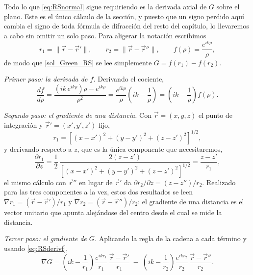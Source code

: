		Todo lo que \eqref{eq:RSnormal} sigue requiriendo es la derivada axial de $G$ sobre el plano. Este es el único cálculo de la sección, y puesto que un signo perdido aquí cambia el signo de toda fórmula de difracción del resto del capítulo, lo llevaremos a cabo sin omitir un solo paso. Para aligerar la notación escribimos
		\begin{equation}\label{eq:RSDistances}
			r_{1} = \|\vec{r}-\vec{r}'\|, \qquad r_{2} = \|\vec{r}-\vec{r}''\|, \qquad f(\rho) = \dfrac{e^{ik\rho}}{\rho},
		\end{equation}
		de modo que \eqref{sol_Green_RS} se lee simplemente $G = f(r_{1}) - f(r_{2})$.

		\textit{Primer paso: la derivada de $f$.} Derivando el cociente,
		\begin{equation}\label{eq:RSderivf}
			\dfrac{df}{d\rho} = \dfrac{\left(ik\,e^{ik\rho}\right)\rho - e^{ik\rho}}{\rho^{2}} = \dfrac{e^{ik\rho}}{\rho}\left(ik - \dfrac{1}{\rho}\right) = \left(ik-\dfrac{1}{\rho}\right)f(\rho).
		\end{equation}

		\textit{Segundo paso: el gradiente de una distancia.} Con $\vec{r} = (x,y,z)$ el punto de integración y $\vec{r}' = (x',y',z')$ fijo,
		\begin{equation}\label{eq:RSr1}
			r_{1} = \left[(x-x')^{2}+(y-y')^{2}+(z-z')^{2}\right]^{1/2},
		\end{equation}
		y derivando respecto a $z$, que es la única componente que necesitaremos,
		\begin{equation}\label{eq:RSdr1dz}
			\dfrac{\partial r_{1}}{\partial z} = \dfrac{1}{2}\,\dfrac{2\left(z-z'\right)}{\left[(x-x')^{2}+(y-y')^{2}+(z-z')^{2}\right]^{1/2}} = \dfrac{z-z'}{r_{1}} ,
		\end{equation}
		el mismo cálculo con $\vec{r}''$ en lugar de $\vec{r}'$ da $\partial r_{2}/\partial z = (z-z'')/r_{2}$. Realizado para las tres componentes a la vez, estos dos resultados se leen $\nabla r_{1} = (\vec{r}-\vec{r}')/r_{1}$ y $\nabla r_{2} = (\vec{r}-\vec{r}'')/r_{2}$: el gradiente de una distancia es el vector unitario que apunta alejándose del centro desde el cual se mide la distancia.

		\textit{Tercer paso: el gradiente de $G$.} Aplicando la regla de la cadena a cada término y usando \eqref{eq:RSderivf},
		\begin{equation}\label{eq:RSgradG}
			\nabla G = \left(ik-\dfrac{1}{r_{1}}\right)\dfrac{e^{ikr_{1}}}{r_{1}}\,\dfrac{\vec{r}-\vec{r}'}{r_{1}} \;-\; \left(ik-\dfrac{1}{r_{2}}\right)\dfrac{e^{ikr_{2}}}{r_{2}}\,\dfrac{\vec{r}-\vec{r}''}{r_{2}} .
		\end{equation}


